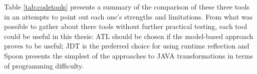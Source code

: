 Table \ref{tab:codetools} presents a summary of the comparison of these three tools in an attempts to point out each one's strengths and limitations. From what was possible to gather about there tools without further practical testing, each tool could be useful in this thesis: ATL should be chosen if the model-based approach proves to be useful; JDT is the preferred choice for using runtime reflection and Spoon presents the simplest of the approaches to JAVA transformations in terms of programming difficulty.



